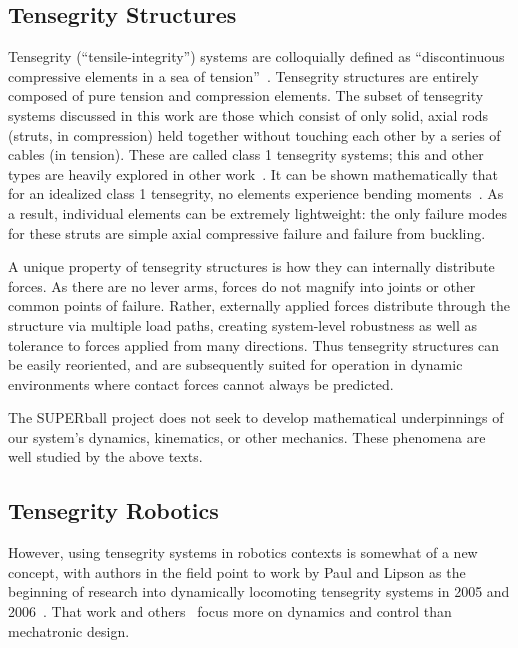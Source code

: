 \documentclass[12pt]{report}
\begin{document}
\subsection{Tensegrity Structures}

Tensegrity (``tensile-integrity'') systems are colloquially defined as ``discontinuous compressive elements in a sea of tension''~\cite{fuller1962tensile}.
Tensegrity structures are entirely composed of pure tension and compression elements.
The subset of tensegrity systems discussed in this work are those which consist of only solid, axial rods (struts, in compression) held together without touching each other by a series of cables (in tension).
These are called class 1 tensegrity systems; this and other types are heavily explored in other work~\cite{C.R.1978,Skelton2009,sultan2002,Motro2003,Zhang2006a,BelHadjAli2010a}.
It can be shown mathematically that for an idealized class 1 tensegrity, no elements experience bending moments~\cite{skelton2001introduction}.
As a result, individual elements can be extremely lightweight: the only failure modes for these struts are simple axial compressive failure and failure from buckling.

A unique property of tensegrity structures is how they can internally distribute forces.  
As there are no lever arms, forces do not magnify into joints or other common points of failure.  
Rather, externally applied forces distribute through the structure via multiple load paths, creating system-level robustness as well as tolerance to forces applied from many directions.  
Thus tensegrity structures can be easily reoriented, and are subsequently suited for operation in dynamic environments where contact forces cannot always be predicted.

The SUPERball project does not seek to develop mathematical underpinnings of our system's dynamics, kinematics, or other mechanics.
These phenomena are well studied by the above texts.

\subsection{Tensegrity Robotics}

However, using tensegrity systems in robotics contexts is somewhat of a new concept, with authors in the field point to work by Paul and Lipson as the beginning of research into dynamically locomoting tensegrity systems in 2005 and 2006~\cite{Paul2005,Paul2006a}.
That work and others~\cite{miratstur2011athree-dof} focus more on dynamics and control than mechatronic design.
\end{document}
